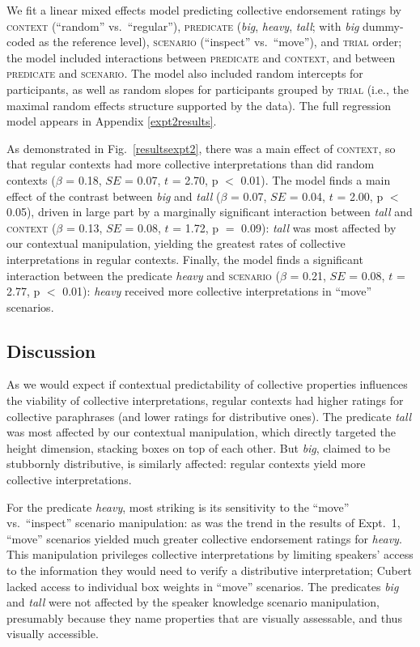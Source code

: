 \documentclass[linguex]{sp}
\begin{document}
We fit a linear mixed effects model predicting collective endorsement ratings by \textsc{context} (``random'' vs.~``regular''),
\textsc{predicate} (\emph{big}, \emph{heavy}, \emph{tall}; with \emph{big} dummy-coded as the reference level),
 \textsc{scenario} (``inspect'' vs.~``move''), and \textsc{trial} order; the model included interactions between \textsc{predicate} and \textsc{context}, and between \textsc{predicate} and \textsc{scenario}. The model also included random intercepts for participants, as well as random slopes for participants grouped by \textsc{trial} (i.e., the maximal random effects structure supported by the data). The full regression model appears in Appendix \ref{expt2results}.

As demonstrated in Fig.~\ref{resultsexpt2}, there was a main effect of \textsc{context}, so that regular contexts had more collective interpretations than did random contexts ($\beta$ = 0.18, $SE$ = 0.07, $t$ = 2.70, p $<$ 0.01). The model finds a main effect of the contrast between \emph{big} and \emph{tall} ($\beta$ = 0.07, $SE$ = 0.04, $t$ = 2.00, p $<$ 0.05), driven in large part by a marginally significant interaction between \emph{tall} and \textsc{context} ($\beta$ = 0.13, $SE$ = 0.08, $t$ = 1.72, p $=$ 0.09): \emph{tall} was most affected by our contextual manipulation, yielding the greatest rates of collective interpretations in regular contexts. Finally, the model finds a significant interaction between the predicate \emph{heavy} and \textsc{scenario} ($\beta$ = 0.21, $SE$ = 0.08, $t$ = 2.77, p $<$ 0.01): \emph{heavy} received more collective interpretations in ``move'' scenarios.

\subsection{Discussion}

As we would expect if contextual predictability of collective properties influences the viability of collective interpretations, regular contexts had higher ratings for collective paraphrases (and lower ratings for distributive ones). The predicate \textit{tall} was most affected by our contextual manipulation, which directly targeted the height dimension, stacking boxes on top of each other. But \emph{big}, claimed to be stubbornly distributive, is similarly affected: regular contexts yield more collective interpretations. 

For the predicate \emph{heavy}, most striking is its sensitivity to the ``move'' vs.~``inspect'' scenario manipulation: as was the trend in the results of Expt.~1, ``move'' scenarios yielded much greater collective endorsement ratings for \emph{heavy}. This manipulation privileges collective interpretations by limiting speakers' access to the information they would need to verify a distributive interpretation; Cubert lacked access to individual box weights in ``move'' scenarios. The predicates \emph{big} and \emph{tall} were not affected by the speaker knowledge scenario manipulation, presumably because they name properties that are visually assessable, and thus visually accessible.
\end{document}
